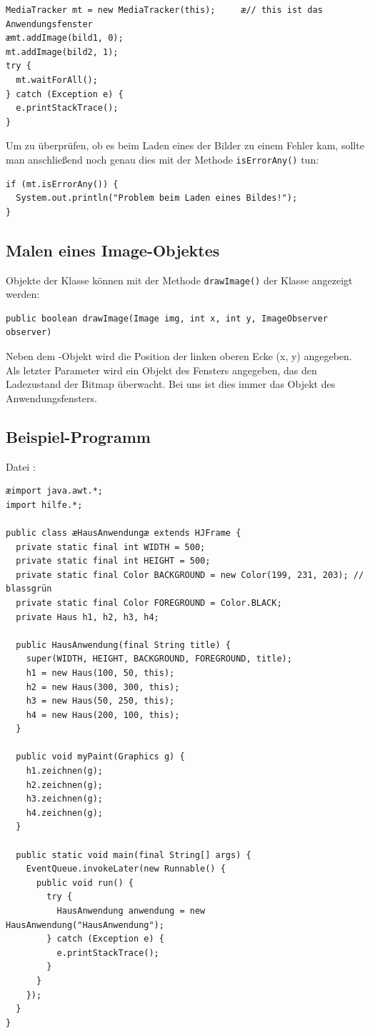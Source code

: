 \begin{lstlisting}
MediaTracker mt = new MediaTracker(this);     æ// this ist das Anwendungsfenster
æmt.addImage(bild1, 0);
mt.addImage(bild2, 1);
try {
  mt.waitForAll();
} catch (Exception e) {
  e.printStackTrace();
}
\end{lstlisting}

Um zu überprüfen, ob es beim Laden eines der Bilder zu einem Fehler kam, sollte
man anschließend noch genau dies mit der Methode \lstinline|isErrorAny()| tun:

\begin{lstlisting}
if (mt.isErrorAny()) {
  System.out.println("Problem beim Laden eines Bildes!");
}
\end{lstlisting}


\subsection{Malen eines Image-Objektes}

Objekte der Klasse  können mit der Methode
\lstinline|drawImage()| der Klasse  angezeigt werden:

\begin{lstlisting}
public boolean drawImage(Image img, int x, int y, ImageObserver observer)
\end{lstlisting}

Neben dem -Objekt wird die Position der linken oberen Ecke (x, y)
angegeben. Als letzter Parameter wird ein Objekt des Fensters angegeben, das
den Ladezustand der Bitmap überwacht. Bei uns ist dies immer das Objekt des
Anwendungsfensters.


\subsection{Beispiel-Programm}

Datei :

\begin{lstlisting}
æimport java.awt.*;
import hilfe.*;

public class æHausAnwendungæ extends HJFrame {
  private static final int WIDTH = 500;
  private static final int HEIGHT = 500;
  private static final Color BACKGROUND = new Color(199, 231, 203); // blassgrün
  private static final Color FOREGROUND = Color.BLACK;
  private Haus h1, h2, h3, h4;

  public HausAnwendung(final String title) {
    super(WIDTH, HEIGHT, BACKGROUND, FOREGROUND, title);
    h1 = new Haus(100, 50, this);
    h2 = new Haus(300, 300, this);
    h3 = new Haus(50, 250, this);
    h4 = new Haus(200, 100, this);
  }
  
  public void myPaint(Graphics g) {
    h1.zeichnen(g);
    h2.zeichnen(g);
    h3.zeichnen(g);
    h4.zeichnen(g);
  }

  public static void main(final String[] args) {
    EventQueue.invokeLater(new Runnable() {
      public void run() {
        try {
          HausAnwendung anwendung = new HausAnwendung("HausAnwendung");
        } catch (Exception e) {
          e.printStackTrace();
        }
      }
    });
  }
}
\end{lstlisting}

